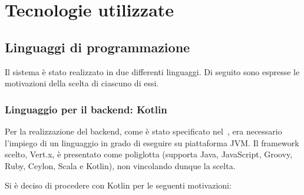 \section{Tecnologie utilizzate}

  \subsection{Linguaggi di programmazione}
    Il sistema è stato realizzato in due differenti linguaggi. Di seguito sono espresse le motivazioni della scelta di ciascuno di essi.

    \subsubsection{Linguaggio per il backend: Kotlin}

      Per la realizzazione del backend, come è stato specificato nel~, era necessario l'impiego di un linguaggio in grado di eseguire su piattaforma JVM\@.
      Il framework scelto, Vert.x, è presentato come poliglotta (supporta Java, JavaScript, Groovy, Ruby, Ceylon, Scala e Kotlin), non vincolando dunque la scelta.

      Si è deciso di procedere con Kotlin per le seguenti motivazioni:

